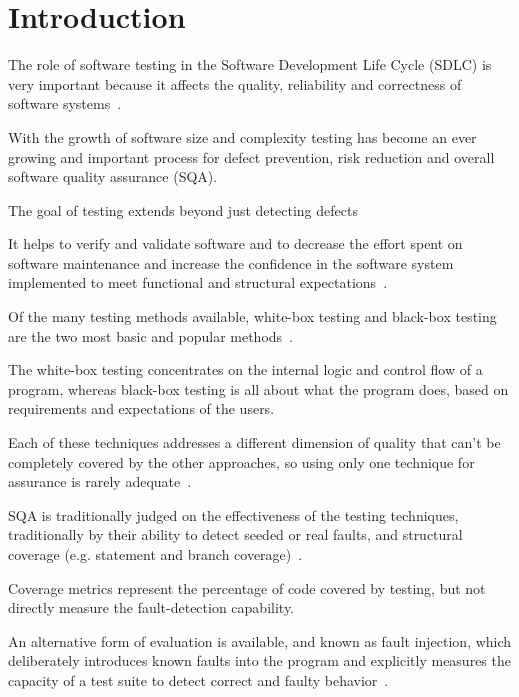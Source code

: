 \documentclass[conference]{IEEEtran}
\begin{document}

\section{Introduction}

\label{sec:intro}



The role of software testing in the Software Development Life Cycle (SDLC) is very important because it affects the quality, reliability and correctness of software systems~\cite{nidhra2012,izzat2023}.

With the growth of software size and complexity testing has become an ever growing and important process for defect prevention, risk reduction and overall software quality assurance (SQA).



The goal of testing extends beyond just detecting defects

It helps to verify and validate software and to decrease the effort spent on software maintenance and increase the confidence in the software system implemented to meet functional and structural expectations~\cite{kumar2015}.

Of the many testing methods available, white-box testing and black-box testing are the two most basic and popular methods~\cite{nidhra2012,alshamaa2025}.

The white-box testing concentrates on the internal logic and control flow of a program, whereas black-box testing is all about what the program does, based on requirements and expectations of the users.

Each of these techniques addresses a different dimension of quality that can't be completely covered by the other approaches, so using only one technique for assurance is rarely adequate~\cite{maspupah2025}.



SQA is traditionally judged on the effectiveness of the testing techniques, traditionally by their ability to detect seeded or real faults, and structural coverage (e.g. statement and branch coverage)~\cite{jia2011}.

Coverage metrics represent the percentage of code covered by testing, but not directly measure the fault-detection capability.

An alternative form of evaluation is available, and known as fault injection, which deliberately introduces known faults into the program and explicitly measures the capacity of a test suite to detect correct and faulty behavior~\cite{jia2011}.
\end{document}
